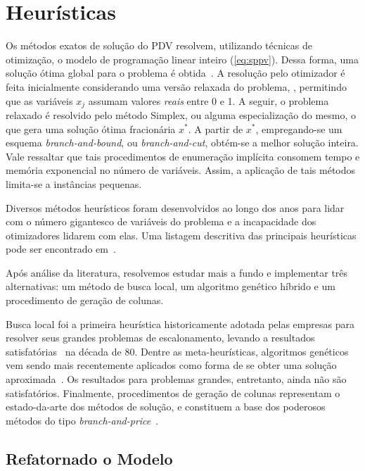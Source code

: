 \zerar
\chapter{Heurísticas}
\label{cap:heuristicas}

Os métodos exatos de solução do PDV resolvem, utilizando técnicas de otimização, o modelo de
programação linear inteiro (\ref{eq:sppv}). Dessa forma, uma solução ótima global para o problema é
obtida~\cite{anbil91b}. A resolução pelo otimizador é feita inicialmente considerando uma versão
relaxada do problema, \ie, permitindo que as variáveis $x_j$ assumam valores {\it reais} entre 0 e
1. A seguir, o problema relaxado é resolvido pelo método Simplex, ou alguma especialização do mesmo,
o que gera uma solução ótima fracionária $x^\ast$. A partir de $x^\ast$, empregando-se um esquema
{\it branch-and-bound}, ou {\it branch-and-cut}, obtém-se a melhor solução inteira. Vale ressaltar
que tais procedimentos de enumeração implícita consomem tempo e memória exponencial no número de
variáveis. Assim, a aplicação de tais métodos limita-se a instâncias pequenas.

Diversos métodos heurísticos foram desenvolvidos ao longo dos anos para lidar com o número
gigantesco de variáveis do problema e a incapacidade dos otimizadores lidarem com elas. Uma
listagem descritiva das principais heurísticas pode ser encontrado em~\cite{gopalakrishnan05}.

Após análise da literatura, resolvemos estudar mais a fundo e implementar três alternativas: um
método de busca local, um algoritmo genético híbrido e um procedimento de geração de colunas. 

Busca local foi a primeira heurística historicamente adotada pelas empresas para resolver seus
grandes problemas de escalonamento, levando a resultados satisfatórias~\cite{gershkoff89} na década
de 80. Dentre as meta-heurísticas, algoritmos genéticos vem sendo mais recentemente aplicados como
forma de se obter uma solução aproximada~\cite{kornilakis02}. Os resultados para problemas grandes,
entretanto, ainda não são satisfatórios. Finalmente, procedimentos de geração de colunas representam
o estado-da-arte dos métodos de solução, e constituem a base dos poderosos métodos do tipo {\it
branch-and-price}~\cite{vance97}.


\section{Refatornado o Modelo}
\label{sec:refatorando}

